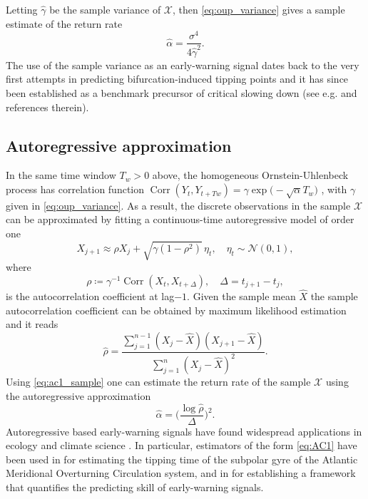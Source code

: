 \documentclass[openacc]{rsproca_new}
\newcommand{\Corr}{\operatorname{Corr}}
\begin{document}
%
Letting $\hat\gamma$ be the sample variance of $\mathcal{X}$, then \eqref{eq:oup_variance} gives a sample estimate of the return rate
%
\begin{equation}\label{eq:OUP}
        \hat\alpha = \frac{\sigma^4}{4\hat\gamma^2} .
\end{equation}
%
The use of the sample variance as an early-warning signal dates back to the very first attempts in predicting bifurcation-induced tipping points and it has since been established as a benchmark precursor of critical slowing down (see e.g. \cite{Kuehn2011} and references therein).

\subsection{Autoregressive approximation}\label{subsec:AC1}
In the same time window $T_w>0$ above, the homogeneous Ornstein-Uhlenbeck process has correlation function $\Corr(Y_t,Y_{t+Tw})=\gamma\exp\bigl(-\sqrt{\alpha}T_w\bigr)$ \cite[\S~$3.8$]{Gardiner2009}, with $\gamma$ given in \eqref{eq:oup_variance}.
As a result, the discrete observations in the sample $\mathcal{X}$ can be approximated by fitting a continuous-time autoregressive model of order one
%
\begin{equation}\label{eq:autoregressive}
        X_{j+1}\approx\rho X_{j} + \sqrt{\gamma(1-\rho^2)}\,\eta_t , \quad \eta_t\sim\mathcal{N}(0,1),
\end{equation}
%
where 
%
\begin{equation}\label{eq:ac1}
        \rho\coloneqq\gamma^{-1}\Corr(X_t,X_{t+\Delta}), \quad \Delta=t_{j+1}-t_j, 
\end{equation}
%
is the autocorrelation coefficient at lag$-1$.
Given the sample mean $\hat X$ the sample autocorrelation coefficient can be obtained by maximum likelihood estimation \cite{Sahalia2002} and it reads
%
\begin{equation}\label{eq:ac1_sample}
        \hat\rho = \frac{\sum_{j=1}^{n-1}(X_j - \hat X)(X_{j+1} - \hat X)}{\sum_{j=1}^{n}(X_j - \hat X)^2}.
\end{equation}
%
Using \eqref{eq:ac1_sample} one can estimate the return rate of the sample $\mathcal{X}$ using the autoregressive approximation 
%
\begin{equation}\label{eq:AC1}
        \hat\alpha = \biggl(\frac{\log\hat\rho}{\Delta}\biggr)^2.
\end{equation}
%
Autoregressive based early-warning signals have found widespread applications in ecology \cite{Dakos2012} and climate science \cite{Boers2021}.
In particular, estimators of the form \eqref{eq:AC1} have been used in \cite{Ditlevsen2023} for estimating the tipping time of the subpolar gyre of the Atlantic Meridional Overturning Circulation system, and in \cite{Ashwin2025} for establishing a framework that quantifies the predicting skill of early-warning signals.
\end{document}
